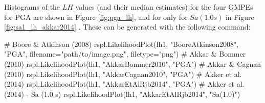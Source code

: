 Histograms of the $LH$ values (and their median estimates) for the four GMPEs for PGA are shown in Figure \ref{fig:pga_lh}, and for only \cite{Akkar_etal2014} for $Sa \left( {1.0 s} \right)$ in Figure \ref{fig:sa1_lh_akkar2014} . These can be generated with the following command:

\begin{python}
# Boore & Atkinson (2008)
rspl.LikelihoodPlot(lh1, "BooreAtkinson2008", "PGA",
                    filename="path/to/image.png",
                    filetype="png")
# Akkar & Bommer (2010)
rspl.LikelihoodPlot(lh1, "AkkarBommer2010", "PGA")
# Akkar & Cagnan (2010)
rspl.LikelihoodPlot(lh1, "AkkarCagnan2010", "PGA")
# Akker et al. (2014)
rspl.LikelihoodPlot(lh1, "AkkarEtAlRjb2014", "PGA")
# Akker et al. (2014) - Sa (1.0 s)
rspl.LikelihoodPlot(lh1, "AkkarEtAlRjb2014", "Sa(1.0)")
\end{python}

